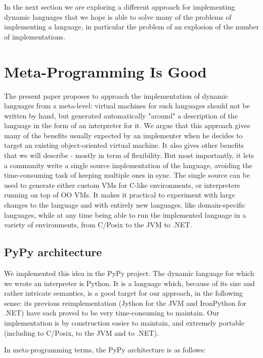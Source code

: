 \documentclass{llncs}
\begin{document}
In the next section we are exploring a different approach for implementing
dynamic languages that we hope is able to solve many of the problems of
implementing a language, in particular the problem of an explosion of the number
of implementations.

\section{Meta-Programming Is Good}

The present paper proposes to approach the implementation of dynamic
languages from a meta-level: virtual machines for such languages should
not be written by hand, but generated automatically "around" a
description of the language in the form of an interpreter for it.  We
argue that this approach gives many of the benefits usually expected by
an implementer when he decides to target an existing object-oriented
virtual machine.  It also gives other benefits that we will describe -
mostly in term of flexibility.  But most importantly, it lets a
community write a single source implementation of the language, avoiding
the time-consuming task of keeping multiple ones in sync.  The single
source can be used to generate either custom VMs for C-like
environments, or interpreters running on top of OO VMs.  It makes it
practical to experiment with large changes to the language and with
entirely new languages, like domain-specific languages, while at any
time being able to run the implemented language in a variety of
environments, from C/Posix to the JVM to .NET.

\subsection{PyPy architecture}

We implemented this idea in the PyPy project.  The dynamic language for
which we wrote an interpreter is Python.  It is a language which,
because of its size and rather intricate semantics, is a good target for
our approach, in the following sense: its previous reimplementation
(Jython for the JVM and IronPython for .NET) have each proved to be very
time-consuming to maintain.  Our implementation is by construction
easier to maintain, and extremely portable (including to C/Posix, to the
JVM and to .NET).

In meta-programming terms, the PyPy architecture is as follows:
\end{document}
